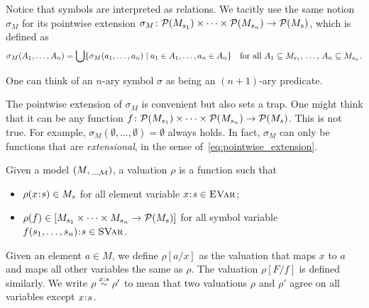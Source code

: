 \documentclass{amsart}
\begin{document}
Notice that symbols are interpreted as relations. 
We tacitly use the same notion $\sigma_M$ for its
pointwise extension 
$\sigma_M \colon \mathcal{P}(M_{s_1}) \times \dots \times \mathcal{P}(M_{s_n}) 
\to \mathcal{P}(M_s)$, which is defined as
\begin{equation}
\label{eq:pointwise_extension}
\sigma_M(A_1,\dots,A_n) = \bigcup 
\{ \sigma_M(a_1,\dots,a_n) \mid  
a_1 \in A_1, \dots, a_n \in A_n
\}
\quad \text{for all $A_1 \subseteq M_{s_1}$, \dots, $A_n \subseteq M_{s_n}$}.
\end{equation}

\begin{remark}

One can think of an $n$-ary symbol $\sigma$
as being an $(n+1)$-ary predicate.

\end{remark}

\begin{remark}

The pointwise extension of $\sigma_M$ is convenient but also sets a trap.
One might think that it can be any function
$f \colon \mathcal{P}(M_{s_1}) \times \dots \times \mathcal{P}( M_{s_n}) \to \mathcal{P}(M_s)$.
This is not true.
For example, $\sigma_M(\emptyset,\dots,\emptyset) = \emptyset$ always holds.
In fact, $\sigma_M$ can only be functions that are \emph{extensional},
in the sense of~\eqref{eq:pointwise_extension}.

\end{remark}

\begin{definition}

Given a model $(M,\__{\mathcal{M}})$, a valuation $\rho$ is a function such that
\begin{itemize}
\item $\rho(x \mathbin{\!:\!} s) \in M_s$ for all element variable $x \mathbin{\!:\!} s \in {\normalfont\textsc{EVar}}$;
\item $\rho(f) \in [M_{s_1} \times \dots \times M_{s_n} \to \mathcal{P}(M_s)]$
for all symbol variable $f(s_1,\dots,s_n)\mathbin{\!:\!} s \in {\normalfont\textsc{SVar}}$.
\end{itemize}
Given an element $a \in M$, 
we define $\rho[a/x]$ as the valuation
that maps $x$ to $a$
and maps all other variables the same as $\rho$.
The valuation $\rho[F / f]$ is defined similarly.
We write $\rho \overset{x : s}{\sim} \rho'$ 
to mean that two valuations $\rho$ and $\rho'$ 
agree on all variables except $x \mathbin{\!:\!} s$. 

\end{definition}
\end{document}
